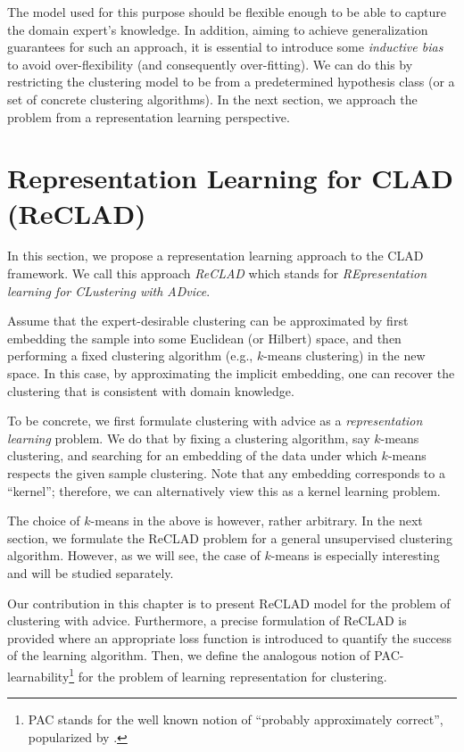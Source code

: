 \documentclass[letterpaper,12pt,titlepage,oneside,final]{book}
\begin{document}
The model used for this purpose should be flexible enough to be able to capture the domain expert's knowledge. In addition, aiming to achieve generalization guarantees for such an approach, it is essential to introduce some \emph{inductive bias} to avoid over-flexibility (and consequently over-fitting). We can do this by restricting the clustering model to be from a predetermined hypothesis class (or a set of concrete clustering algorithms). In the next section, we approach the problem from a representation learning perspective.


\section{Representation Learning for CLAD (ReCLAD)}

In this section, we propose a representation learning approach to the CLAD framework. We call this approach \textit{ReCLAD} which stands for \textit{REpresentation learning for CLustering with ADvice}.

Assume that the expert-desirable clustering can be approximated by first embedding the sample into some Euclidean (or Hilbert) space, and then performing a fixed clustering algorithm (e.g., $k$-means clustering) in the new space. In this case, by approximating the implicit embedding, one can recover the clustering that is consistent with domain knowledge.

To be concrete, we first formulate clustering with advice as a \emph{representation learning} problem. We do that by fixing a clustering algorithm, say $k$-means clustering, and searching for an embedding of the data under which $k$-means respects the given sample clustering. Note that any embedding corresponds to a ``kernel''; therefore, we can alternatively view this as a kernel learning problem.

The choice of $k$-means in the above is however, rather arbitrary. In the next section, we formulate the ReCLAD problem for a general unsupervised clustering algorithm. However, as we will see, the case of $k$-means is especially interesting and will be studied separately.



Our contribution in this chapter is to present ReCLAD model for the problem of clustering with advice. Furthermore, a precise formulation of ReCLAD is provided where an appropriate loss function is introduced to quantify the success of the learning algorithm. Then, we define the analogous notion of PAC-learnability\footnote{PAC stands for the well known notion of ``probably approximately correct'', popularized by \cite{valiant1984theory}.} for the problem of learning representation for clustering. 
\end{document}
